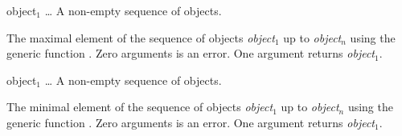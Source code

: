 \begin{optDefinition}
%
\begin{arguments}
    \item[object$_1$ \ldots] A non-empty sequence of objects.
\end{arguments}
%
\result%
The maximal element of the sequence of objects {\em object$_1$} up to {\em
    object$_n$} using the generic function .  Zero arguments
is an error.  One argument returns {\em object$_1$}.

%
\begin{arguments}
    \item[object$_1$ \ldots] A non-empty sequence of objects.
\end{arguments}
%
\result%
The minimal element of the sequence of objects {\em object$_1$} up to {\em
    object$_n$} using the generic function .  Zero arguments
is an error.  One argument returns {\em object$_1$}.
%
\end{optDefinition}

